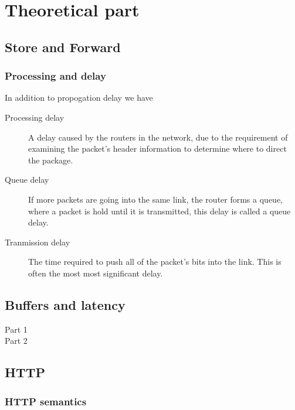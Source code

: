 \documentclass[a4paper]{article}
\begin{document}
\maketitle
\thispagestyle{first}
\newpage

\section{Theoretical part}
\subsection{Store and Forward}
\subsubsection{Processing and delay}
In addition to propogation delay we have

\begin{description}
    \item[Processing delay] A delay caused by the routers in the network,
        due to the requirement of examining the packet's header information to
        determine where to direct the package.
    \item[Queue delay] If more packets are going into the same link, the
        router forms a queue, where a packet is hold until it is
        transmitted, this delay is called a queue delay.
    \item[Tranmission delay] The time required to push all of the packet's bits
        into the link. This is often the most most significant delay.
\end{description}

\subsection{Buffers and latency}
\begin{description}
    \item[Part 1]
    \item[Part 2]
\end{description}

\subsection{HTTP}
\subsubsection{HTTP semantics}
\end{document}
